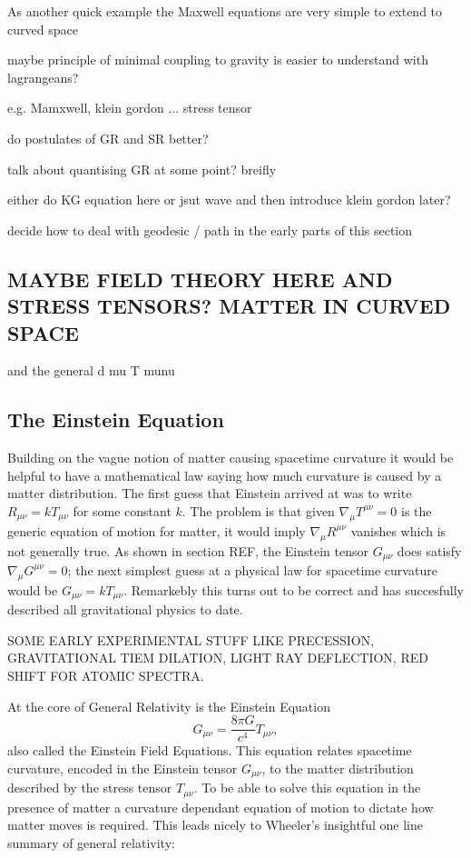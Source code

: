As another quick example the Maxwell equations are very simple to extend to curved space

maybe principle of minimal coupling to gravity is easier to understand with lagrangeans?

e.g. Mamxwell, klein gordon ... stress tensor

do postulates of GR and SR better?

talk about quantising GR at some point? breifly

either do KG equation here or jsut wave and then introduce klein gordon later?

decide how to deal with geodesic / path in the early parts of this section

\subsection{MAYBE FIELD THEORY HERE AND STRESS TENSORS? MATTER IN CURVED SPACE}
and the general d mu T munu

\subsection{The Einstein Equation}
Building on the vague notion of matter causing spacetime curvature it would be helpful to have a mathematical law saying how much curvature is caused by a matter distribution. The first guess that Einstein arrived at was to write $R_{\mu\nu}=kT_{\mu\nu}$ for some constant $k$. The problem is that given $\nabla_\mu T^{\mu\nu}=0$ is the generic equation of motion for matter, it would imply $\nabla_\mu R^{\mu\nu}$ vanishes which is not generally true. As shown in section REF, the Einstein tensor $G_{\mu\nu}$ does satisfy $\nabla_\mu G^{\mu\nu}=0$; the next simplest guess at a physical law for spacetime curvature would be $G_{\mu\nu} = k T_{\mu\nu}$. Remarkebly this turns out to be correct and has succesfully described all gravitational physics to date. 

SOME EARLY EXPERIMENTAL STUFF LIKE PRECESSION, GRAVITATIONAL TIEM DILATION, LIGHT RAY DEFLECTION, RED SHIFT FOR ATOMIC SPECTRA.

At the core of General Relativity is the Einstein Equation
\begin{equation}
G_{\mu\nu} = \frac{8 \pi G}{c^4}T_{\mu\nu},
\end{equation}
also called the Einstein Field Equations. This equation relates spacetime curvature, encoded in the Einstein tensor $G_{\mu\nu}$, to the matter distribution described by the stress tensor $T_{\mu\nu}$. To be able to solve this equation in the presence of matter a curvature dependant equation of motion to dictate how matter moves is required. This leads nicely to Wheeler's insightful one line summary of general relativity: 

